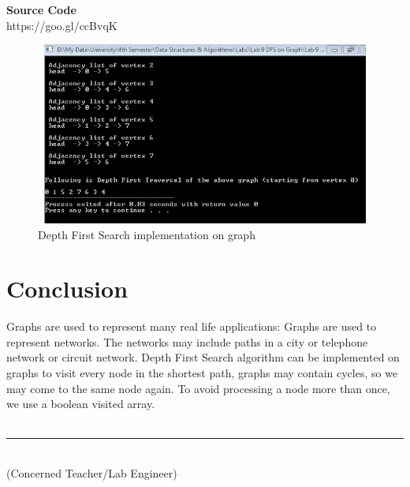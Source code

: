 \documentclass[11pt]{article}            %
\newcommand\tab[1][1cm]{\hspace*{#1}}
\begin{document}
\textbf{Source Code} \\
https://goo.gl/ccBvqK

\begin{figure}[b!]
\centering
  \includegraphics[width=12cm,height=6cm,keepaspectratio]{1.png}
\caption{Depth First Search implementation on graph}
\label{Figure:1}    
\end{figure}

\section{Conclusion}
\justify Graphs are used to represent many real life applications: Graphs are used to represent networks. The networks may include paths in a city or telephone network or circuit network. Depth First Search algorithm can be implemented on graphs to visit every node in the shortest path, graphs may contain cycles, so we may come to the same node again. To avoid processing a node more than once, we use a boolean visited array.\\~\\

\tab[6cm] \noindent\rule{6cm}{0.4pt}\\
\tab[6cm] (Concerned Teacher/Lab Engineer)


 
\end{document}
